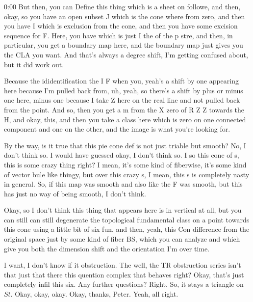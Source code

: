 \begin{unfinished}{0:00}
But then, you can Define this thing which is a sheet on followe, and then, okay, so you have an open subset J which is the cone where from zero, and then you have I which is exclusion from the cone, and then you have some excision sequence for F. Here, you have which is just I the of the p stre, and then, in particular, you get a boundary map here, and the boundary map just gives you the CLA you want. And that's always a degree shift, I'm getting confused about, but it did work out.

Because the ididentification the I F when you, yeah's a shift by one appearing here because I'm pulled back from, uh, yeah, so there's a shift by plus or minus one here, minus one because I take Z here on the real line and not pulled back from the point. And so, then you get a m from the X zero of R Z Z towards the H, and okay, this, and then you take a class here which is zero on one connected component and one on the other, and the image is what you're looking for.

By the way, is it true that this pie cone def is not just triable but smooth? No, I don't think so. I would have guessed okay, I don't think so. I so this cone of s, this is some crazy thing right? I mean, it's some kind of fiberwise, it's some kind of vector bule like thingy, but over this crazy s, I mean, this s is completely nasty in general. So, if this map was smooth and also like the F was smooth, but this has just no way of being smooth, I don't think.

Okay, so I don't think this thing that appears here is in vertical at all, but you can still can still degenerate the topological fundamental class on a point towards this cone using a little bit of six fun, and then, yeah, this Con difference from the original space just by some kind of fiber BS, which you can analyze and which give you both the dimension shift and the orientation I'm over time.

I want, I don't know if it obstruction. The well, the TR obstruction series isn't that just that there this quention complex that behaves right? Okay, that's just completely infil this six. Any further questions?
Right. So, it stays a triangle on $St$. Okay, okay, okay. Okay, thanks, Peter. Yeah, all right.

\end{unfinished}